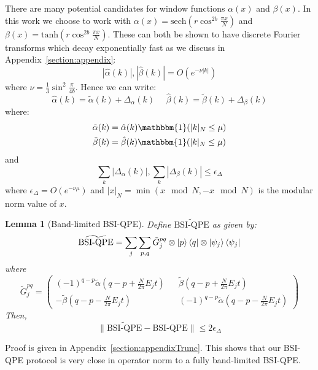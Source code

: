 \documentclass[aps,floatfix,10pt,amssymb,amsfont,amsmath,superscriptaddress,float,nofootinbib,longbibliography,nobalancelastpage,twocolumn]{revtex4-2}
\newtheorem{lemma}{Lemma}
\begin{document}
There are many potential candidates for window functions $\alpha(x)$ and $\beta(x)$. In this work we choose to work with $\alpha(x) = \text{sech}( r\cos^{2b} \frac{\pi x}{N})$ and $\beta(x) = \text{tanh}(r \cos^{2b} \frac{\pi x}{N})$. These can both be shown to have discrete Fourier transforms which decay exponentially fast as we discuss in Appendix~\ref{section:appendix}:
\begin{equation}
    |\hat \alpha(k)|,|\hat \beta(k)| = O\left( e^{-\nu |k|}\right)
    \label{eq:scaling}
\end{equation}
where $\nu = \frac{1}{3}\sin^2\frac{\pi}{4b}$. Hence we can write:
\begin{equation}
    \hat\alpha(k) = \tilde\alpha(k) + \Delta_{\alpha}(k) \>\>\>\>\>\>\hat\beta(k) = \tilde\beta(k) + \Delta_{\beta}(k)
    \label{eq:decomposealpha}
\end{equation}
where:
\begin{align}
    \tilde\alpha(k) &= \hat\alpha(k)\mathbbm{1}(|k|_{N}\leq \mu)\\
    \tilde\beta(k) &= \hat\beta(k)\mathbbm{1}(|k|_{N}\leq \mu)
    \label{eq:decomposealpha2}
\end{align}  and
\begin{equation}
    \sum_k|\Delta_\alpha(k)|,\sum_k|\Delta_\beta(k)|\leq \epsilon_{\Delta}
    \label{eq:decomposealpha3}
\end{equation} where $\epsilon_{\Delta} = O(e^{-\nu \mu})$ and $|x|_N = \min(x \mod N,- x\mod N)$ is the modular norm value of $x$.

\begin{lemma}[Band-limited BSI-QPE]
\label{lemma:0}
    Define $\widetilde{\text{BSI-QPE}}$ as given by:
    \begin{equation}
       \widetilde{\text{BSI-QPE}}= \sum_j \sum_{p,q} \tilde G^{pq}_j \otimes \ket{p}\bra{q} \otimes \ket{\psi_j}\bra{\psi_j}
    \end{equation}
    where 
    \begin{equation}
        \tilde G^{pq}_j = \left(\begin{smallmatrix}
        (-1)^{q-p}\tilde\alpha(q-p+\frac{N}{2\pi}E_jt) && \tilde\beta(q-p+\frac{N}{2\pi}E_jt)\\
        -\tilde\beta (q-p-\frac{N}{2\pi}E_jt) && (-1)^{q-p}\tilde\alpha(q-p-\frac{N}{2\pi}E_jt)
    \end{smallmatrix}\right)
    \end{equation}
    Then,  
    \begin{equation}
        \|\widetilde{\text{BSI-QPE}}-\text{BSI-QPE}\| \leq 2\epsilon_{\Delta}
    \end{equation}
\end{lemma}
Proof is given in Appendix~\ref{section:appendixTrunc}. This shows that our BSI-QPE protocol is very close in operator norm to a fully band-limited BSI-QPE.
\end{document}
